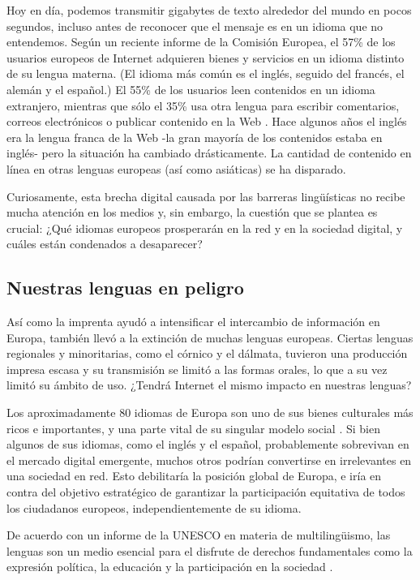 \begin{multicols}{2}
  Hoy en día, podemos transmitir gigabytes de texto alrededor del mundo en pocos segundos, incluso antes de reconocer que el mensaje es en un idioma que no entendemos. Según un reciente informe de la Comisión Europea, el 57\% de los usuarios europeos de Internet adquieren bienes y servicios en un idioma distinto de su lengua materna. (El idioma más común es el inglés, seguido del francés, el alemán y el español.) El 55\% de los usuarios leen contenidos en un idioma extranjero, mientras que sólo el 35\% usa otra lengua para escribir comentarios, correos electrónicos o publicar contenido en la Web \cite{EC1}.  Hace algunos años el inglés era la lengua franca de la Web -la gran mayoría de los contenidos estaba en inglés- pero la situación ha cambiado drásticamente. La cantidad de contenido en línea en otras lenguas europeas (así como asiáticas) se ha disparado.

  Curiosamente, esta brecha digital causada por las barreras lingüísticas no recibe mucha atención en los medios y, sin embargo, la cuestión que se plantea es crucial: ¿Qué idiomas europeos prosperarán en la red y en la sociedad digital, y cuáles están condenados a desaparecer?


\subsection{Nuestras lenguas en peligro}

  Así como la imprenta ayudó a intensificar el intercambio de información en Europa, también llevó a la extinción de muchas lenguas europeas. Ciertas lenguas regionales y minoritarias, como el córnico y el dálmata, tuvieron una producción impresa escasa y su transmisión se limitó a las formas orales, lo que a su vez limitó su ámbito de uso. ¿Tendrá  Internet el mismo impacto en nuestras lenguas?

  Los aproximadamente 80 idiomas de Europa son uno de sus bienes culturales más ricos e importantes, y una parte vital de su singular modelo social \cite{EC2}.
  Si bien algunos de sus idiomas, como el inglés y el español, probablemente sobrevivan en el mercado digital emergente, muchos otros podrían convertirse en irrelevantes en una sociedad en red. Esto debilitaría la posición global de Europa, e iría en contra del objetivo estratégico de garantizar la participación equitativa de todos los ciudadanos europeos, independientemente de su idioma. 
  
  De acuerdo con un informe de la UNESCO en materia de multilingüismo, las lenguas son un medio esencial para el disfrute de derechos fundamentales como la expresión política, la educación y la participación en la sociedad \cite{Unesco1}.  


\end{multicols}
